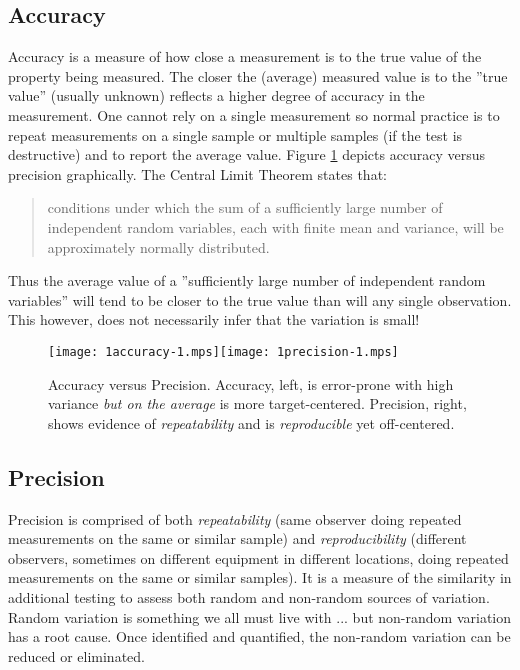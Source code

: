 \subsection{Accuracy}
Accuracy is a measure of how close a measurement is to the true value of the property being measured.  The closer the (average) measured value is to the ''true value'' (usually unknown) reflects a higher degree of accuracy in the measurement.  One cannot rely on a single measurement so normal practice is to repeat measurements on a single sample or multiple samples (if the test is destructive) and to report the average value. Figure \ref{AvsP} depicts accuracy versus precision graphically. The Central Limit Theorem states that:
\begin{quote}
conditions under which the sum of a sufficiently large number of independent random variables, each with finite mean and variance, will be approximately normally distributed.\cite{rice1995mathematical} 
\end{quote}
Thus the average value of a ''sufficiently large number of independent random variables'' will tend to be closer to the true value than will any single observation.  This however, does not necessarily infer that the variation is small!

\begin{figure}
	\begin{center}
		\vspace{3mm}
		\texttt{[image: 1accuracy-1.mps]}\hspace{5mm}\texttt{[image: 1precision-1.mps]}
	\end{center}
	\caption{Accuracy versus Precision. Accuracy, left, is error-prone with high variance \textit{but on the average} is more target-centered. Precision, right, shows evidence of \textit{repeatability} and is \textit{reproducible} yet off-centered.}\label{AvsP}
\end{figure}

\subsection{Precision}
Precision is comprised of both \textit{repeatability} (same observer doing repeated measurements on the same or similar sample) and \textit{reproducibility} (different observers, sometimes on different equipment in different locations, doing repeated measurements on the same or similar samples).  It is a measure of the similarity in additional testing to assess both random and non-random sources of variation.  Random variation is something we all must live with ... but non-random variation has a root cause.  Once identified and quantified, the non-random variation can be reduced or eliminated.

